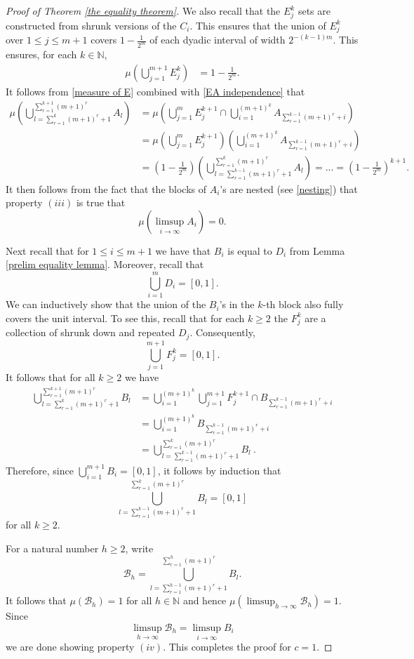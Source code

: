 \documentclass[12pt]{article}
\begin{document}
\begin{proof}[Proof of Theorem \ref{the equality theorem}]
 We also recall that the $E^k_j$ sets are constructed from shrunk versions of the $C_i$. This ensures that 
 the union of $E^k_j$ over $1 \leq j\leq m+1$ covers $1-\frac{1}{2^m}$ of each dyadic interval of width $2^{-(k-1)m}$. This ensures, for each $k \in \mathbb{N}$,
\begin{align} \label{measure of E}
\mu\left(\bigcup_{j=1}^{m+1}{E_j^k}\right) &= 1-\frac{1}{2^m}.    
\end{align}
It follows from \eqref{measure of E} combined with \eqref{EA independence} that
 \begin{align*}
    \mu \left(  \bigcup_{l=\sum_{r=1}^{k} (m+1)^{r}+1}^{\sum_{r=1}^{k+1} (m+1)^{r}} A_l \right) &= \mu \left( \bigcup_{j=1}^m  E_j^{k+1} \cap  \bigcup_{i=1}^{(m+1)^{k}} A_{\sum_{r=1}^{k-1} (m+1)^r+i}  \right) \\
    &= \mu \left( \bigcup_{j=1}^m  E_j^{k+1} \right) \left(  \bigcup_{i=1}^{(m+1)^{k}} A_{\sum_{r=1}^{k-1} (m+1)^r+i}  \right) \\
    &=\left( 1-\frac{1}{2^m} \right) \left( \bigcup_{l=\sum_{r=1}^{k-1} (m+1)^{r}+1}^{\sum_{r=1}^{k}(m+1)^{r}} A_l  \right) = ...=\left( 1-\frac{1}{2^m} \right)^{k+1}.
    \end{align*}
It then follows from the fact that the blocks of $A_i$'s are nested (see \eqref{nesting}) that property $(iii)$ is true that \[\mu(\limsup_{i \rightarrow \infty}A_i)=0.\]

Next recall that for $1 \leq i \leq m+1$ we have that $B_i$ is equal to $D_i$ from Lemma \ref{prelim equality lemma}. Moreover, recall that 
\[ \bigcup_{i=1}^{m}{D_i} = [0,1].\]
We can inductively show that the union of the $B_i$'s in the $k$-th block also fully covers the unit interval. To see this, recall that for each $k \geq 2$ the $F_j^k$ are a collection of shrunk down and repeated $D_j$. Consequently,
\[\bigcup_{j=1}^{m+1}{F_j^k} = [0,1].\]
It follows that for all $k \geq 2$ we have 
    \begin{align*}
        \bigcup_{l=\sum_{r=1}^{k} (m+1)^{r}+1}^{\sum_{r=1}^{k+1} (m+1)^{r}} B_l &= \bigcup_{i=1}^{(m+1)^{k}} \bigcup_{j=1}^{m+1} F_j^{k+1} \cap B_{\sum_{r=1}^{k-1} (m+1)^r+i}  \\
        &=\bigcup_{i=1}^{(m+1)^{k}} B_{\sum_{r=1}^{k-1}(m+1)^r+i} \\
        &= \bigcup_{l=\sum_{r=1}^{k-1}(m+1)^r +1}^{\sum_{r=1}^{k}(m+1)^r} B_l ~.
    \end{align*}
Therefore, since $\bigcup_{i=1}^{m+1}{B_i} = [0,1]$, it follows by induction that
\[\bigcup_{l=\sum_{r=1}^{k-1} (m+1)^{r}+1}^{\sum_{r=1}^{k} (m+1)^{r}} B_l = [0,1]\]
for all $k \geq 2$. 

For a natural number $h \geq 2$, write
\[\mathcal{B}_h = \bigcup_{l=\sum_{r=1}^{h-1} (m+1)^{r}+1}^{\sum_{r=1}^{h} (m+1)^{r}} B_l.\]
It follows that $\mu{(\mathcal{B}_h)}=1$ for all $h \in \mathbb{N}$ and hence $\mu(\limsup_{h \to \infty}{\mathcal{B}_h}) = 1$. Since 
\[\limsup_{h \to \infty}{\mathcal{B}_h}  =\limsup_{i \to \infty} B_i\] we are done showing property $(iv)$. This completes the proof for $c=1$. 
\end{proof}
\end{document}
